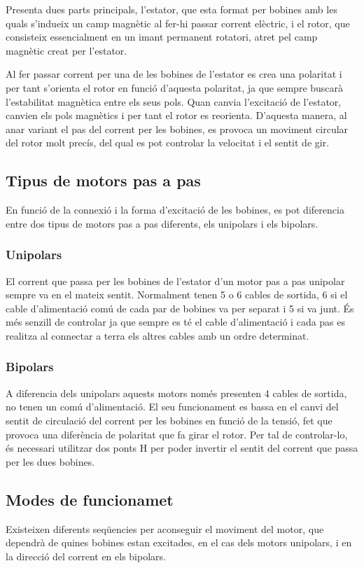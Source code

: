 Presenta dues parts principals, l'estator, que esta format per bobines amb les quals s'indueix un camp magnètic al fer-hi passar corrent elèctric, i el rotor, que consisteix essencialment en un imant permanent rotatori, atret pel camp magnètic creat per l'estator. 


Al fer passar corrent per una de les bobines de l'estator es crea una polaritat i per tant s'orienta el rotor en funció d'aquesta polaritat, ja que sempre buscarà l'estabilitat magnètica entre els seus pols. Quan canvia l'excitació de l'estator, canvien els pols magnètics i per tant el rotor es reorienta. D'aquesta manera, al anar variant el pas del corrent per les bobines, es provoca un moviment circular del rotor molt precís, del qual es pot controlar la velocitat i el sentit de gir. 


\subsection{Tipus de motors pas a pas}
En funció de la connexió i la forma d'excitació de les  bobines, es pot diferencia entre dos tipus de motors pas a pas diferents, els unipolars i els bipolars.


\subsubsection{Unipolars}
El corrent que passa per les bobines de l'estator d'un motor pas a pas unipolar sempre va en el mateix sentit. Normalment tenen 5 o 6 cables de sortida, 6 si el cable d'alimentació comú de cada par de bobines va per separat i 5 si va junt. És més senzill de controlar ja que sempre es té el cable d'alimentació i cada pas es realitza al connectar a terra els altres cables amb un ordre determinat.

\subsubsection{Bipolars}
A diferencia dels unipolars aquests motors només presenten 4 cables de sortida, no tenen un comú d'alimentació. El seu funcionament es bassa en el canvi del sentit de circulació del corrent per les bobines en funció de la tensió, fet que provoca una diferència de polaritat que fa girar el rotor. Per tal de controlar-lo, és necessari utilitzar dos ponts H per poder invertir el sentit del corrent que passa per les dues bobines. 


\subsection{Modes de funcionamet}
Existeixen diferents seqüencies per aconseguir el moviment del motor, que dependrà de quines bobines estan excitades, en el cas dels motors unipolars, i en la direcció del corrent en els bipolars. 


